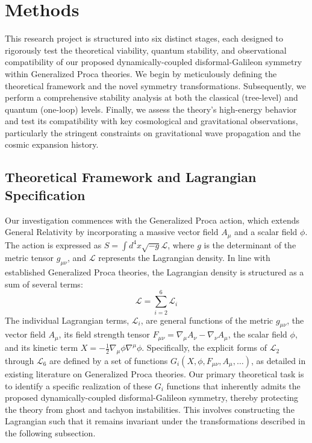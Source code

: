 \documentclass[twocolumn]{aastex631}
\begin{document}
\section{Methods}
\label{sec:methods}
This research project is structured into six distinct stages, each designed to rigorously test the theoretical viability, quantum stability, and observational compatibility of our proposed dynamically-coupled disformal-Galileon symmetry within Generalized Proca theories. We begin by meticulously defining the theoretical framework and the novel symmetry transformations. Subsequently, we perform a comprehensive stability analysis at both the classical (tree-level) and quantum (one-loop) levels. Finally, we assess the theory's high-energy behavior and test its compatibility with key cosmological and gravitational observations, particularly the stringent constraints on gravitational wave propagation and the cosmic expansion history.

\subsection{Theoretical Framework and Lagrangian Specification}

Our investigation commences with the Generalized Proca action, which extends General Relativity by incorporating a massive vector field $A_\mu$ and a scalar field $\phi$. The action is expressed as $S = \int d^4x \sqrt{-g} \mathcal{L}$, where $g$ is the determinant of the metric tensor $g_{\mu\nu}$, and $\mathcal{L}$ represents the Lagrangian density. In line with established Generalized Proca theories, the Lagrangian density is structured as a sum of several terms:
$$
\mathcal{L} = \sum_{i=2}^{6} \mathcal{L}_i
$$
The individual Lagrangian terms, $\mathcal{L}_i$, are general functions of the metric $g_{\mu\nu}$, the vector field $A_\mu$, its field strength tensor $F_{\mu\nu} = \nabla_\mu A_\nu - \nabla_\nu A_\mu$, the scalar field $\phi$, and its kinetic term $X = -\frac{1}{2} \nabla_\mu \phi \nabla^\mu \phi$. Specifically, the explicit forms of $\mathcal{L}_2$ through $\mathcal{L}_6$ are defined by a set of functions $G_i(X, \phi, F_{\mu\nu}, A_\mu, \dots)$, as detailed in existing literature on Generalized Proca theories. Our primary theoretical task is to identify a specific realization of these $G_i$ functions that inherently admits the proposed dynamically-coupled disformal-Galileon symmetry, thereby protecting the theory from ghost and tachyon instabilities. This involves constructing the Lagrangian such that it remains invariant under the transformations described in the following subsection.
\end{document}

